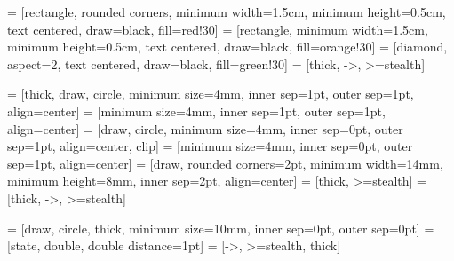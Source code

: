\newcommand{\graphimgsize}{.75}

 = [rectangle, rounded corners, minimum width=1.5cm,
  minimum height=0.5cm, text centered, draw=black, fill=red!30]
 = [rectangle, minimum width=1.5cm,
  minimum height=0.5cm, text centered, draw=black, fill=orange!30]
 = [diamond, aspect=2, text centered,
  draw=black, fill=green!30]
 = [thick, ->, >=stealth]

 = [thick, draw, circle, minimum size=4mm,
  inner sep=1pt, outer sep=1pt, align=center]
 = [minimum size=4mm, inner sep=1pt,
  outer sep=1pt, align=center]
 = [draw, circle, minimum size=4mm, inner sep=0pt,
  outer sep=1pt, align=center, clip]
 = [minimum size=4mm, inner sep=0pt,
  outer sep=1pt, align=center]
 = [draw, rounded corners=2pt, minimum width=14mm,
  minimum height=8mm, inner sep=2pt, align=center]
 = [thick, >=stealth]
 = [thick, ->, >=stealth]

 = [draw, circle, thick, minimum size=10mm,
  inner sep=0pt, outer sep=0pt]
 = [state, double, double distance=1pt]
 = [->, >=stealth, thick]

\newcommand{\state}[4][]{%
  \node[state,#1] (#2) at #3 {#4};%
}
\newcommand{\acceptingstate}[4][]{%
  \node[acceptstate,#1] (#2) at #3 {#4};%
}
\newcommand{\transitionarrow}[5][]{%
  \path (#2) edge[transition,#1] node[#3] {#4} (#5);%
}
\newcommand{\initialstate}[6][]{%
  \node[state,#1] (#2) at #3 {#4};%
  \draw[transition] #5 -- (#2.#6);%
}


\makeatletter
\renewcommand\@makefnmark{%
  \hbox{\@textsuperscript{\normalfont\@thefnmark}}%
}
\long{}
\makeatother

\makeatletter
{}
\makeatother
